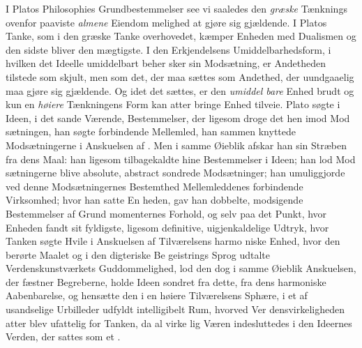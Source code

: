 I Platos Philosophies Grundbestemmelser see vi saaledes
den \emph{græske} Tænknings ovenfor paaviste \emph{almene} Eiendom\-%
melighed at gjøre sig gjældende. I Platos Tanke, som i den
græske Tanke overhovedet, kæmper Enheden med Dualismen
og den sidste bliver den mægtigste. I den Erkjendelsens
Umiddelbarhedsform, i hvilken det Ideelle umiddelbart beher\-%
sker sin Modsætning, er Andetheden tilstede som skjult, men
som det, der maa sættes som Andethed, der uundgaaelig maa
gjøre sig gjældende. Og idet det sættes, er den \emph{umiddel\-%
bare} Enhed brudt og kun en \emph{høiere} Tænkningens Form kan
atter bringe Enhed tilveie. Plato søgte i Ideen, i det sande
Værende, Bestemmelser, der ligesom droge det hen imod Mod\-%
sætningen, han søgte forbindende Mellemled, han sammen\-%
knyttede Modsætningerne i Anskuelsen af . Men i
samme Øieblik afskar han sin Stræben fra dens Maal: han
ligesom tilbagekaldte hine Bestemmelser i Ideen; han lod Mod\-%
sætningerne blive absolute, abstract sondrede Modsætninger;
han umuliggjorde ved denne Modsætningernes Bestemthed
Mellemleddenes forbindende Virksomhed; hvor han satte En\-%
heden, gav han dobbelte, modsigende Bestemmelser af Grund\-%
momenternes Forhold, og selv paa det Punkt, hvor Enheden
fandt sit fyldigste, ligesom definitive, uigjenkaldelige Udtryk,
hvor Tanken søgte Hvile i Anskuelsen af Tilværelsens harmo\-%
niske Enhed, hvor den berørte Maalet og i den digteriske Be\-%
geistrings Sprog udtalte Verdenskunstværkets Guddommelighed,
lod den dog i samme Øieblik Anskuelsen, der fæstner Begreberne,
holde Ideen sondret fra dette, fra dens harmoniske Aabenbarelse,
og hensætte den i en høiere Tilværelsens Sphære, i et af
usandselige Urbilleder udfyldt intelligibelt Rum, hvorved Ver\-%
densvirkeligheden atter blev ufattelig for Tanken, da al virke\-%
lig Væren indesluttedes i den Ideernes Verden, der sattes som
et .

